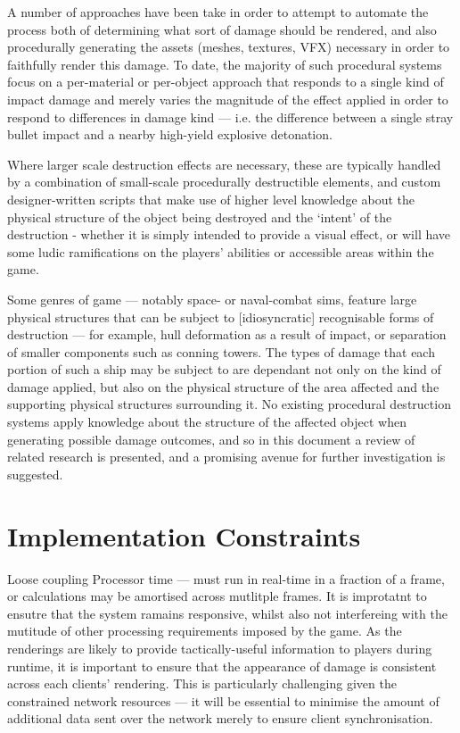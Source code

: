 \documentclass[11pt]{report}
\begin{document}
	A number of approaches have been take in order to attempt to automate the process both of determining what sort of damage should be rendered, and also procedurally generating the assets (meshes, textures, VFX) necessary in order to faithfully render this damage. To date, the majority of such procedural systems focus on a per-material or per-object approach that responds to a single kind of impact damage and merely varies the magnitude of the effect applied in order to respond to differences in damage kind --- i.e. the difference between a single stray bullet impact and a nearby high-yield explosive detonation.

	Where larger scale destruction effects are necessary, these are typically handled by a combination of small-scale procedurally destructible elements, and custom designer-written scripts that make use of higher level knowledge about the physical structure of the object being destroyed and the `intent' of the destruction - whether it is simply intended to provide a visual effect, or will have some ludic ramifications on the players' abilities or accessible areas within the game.

	Some genres of game --- notably space- or naval-combat sims, feature large physical structures that can be subject to [idiosyncratic] recognisable forms of destruction --- for example, hull deformation as a result of impact, or separation of smaller components such as conning towers. The types of damage that each portion of such a ship may be subject to are dependant not only on the kind of damage applied, but also on the physical structure of the area affected and the supporting physical structures surrounding it. No existing procedural destruction systems apply knowledge about the structure of the affected object when generating possible damage outcomes, and so in this document a review of related research is presented, and a promising avenue for further investigation is suggested.

	\section{Implementation Constraints}
		Loose coupling
		Processor time --- must run in real-time in a fraction of a frame, or calculations may be amortised across mutlitple frames. It is improtatnt to ensutre that the system ramains responsive, whilst also not interfereing with the mutitude of other processing requirements imposed by the game.
		As the renderings are likely to provide tactically-useful information to players during runtime, it is important to ensure that the appearance of damage is consistent across each clients' rendering. This is particularly challenging given the constrained network resources --- it will be essential to minimise the amount of additional data sent over the network merely to ensure client synchronisation.
\end{document}
